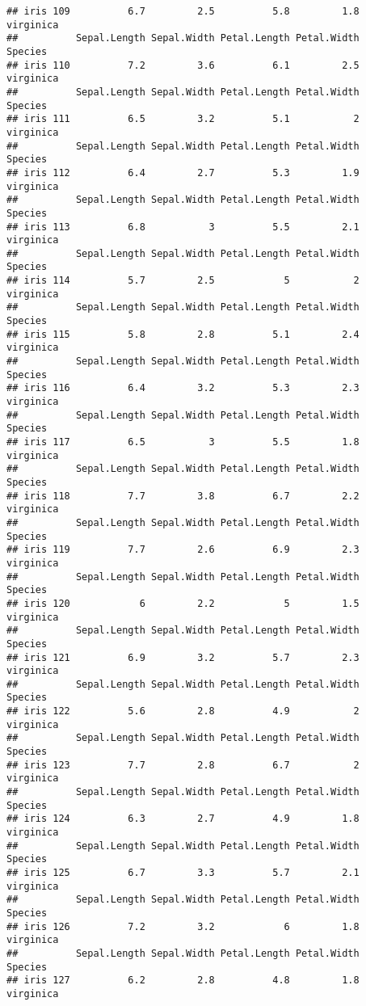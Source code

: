 \documentclass[
]{article}
\begin{document}
\begin{verbatim}
## iris 109          6.7         2.5          5.8         1.8 virginica
##          Sepal.Length Sepal.Width Petal.Length Petal.Width   Species
## iris 110          7.2         3.6          6.1         2.5 virginica
##          Sepal.Length Sepal.Width Petal.Length Petal.Width   Species
## iris 111          6.5         3.2          5.1           2 virginica
##          Sepal.Length Sepal.Width Petal.Length Petal.Width   Species
## iris 112          6.4         2.7          5.3         1.9 virginica
##          Sepal.Length Sepal.Width Petal.Length Petal.Width   Species
## iris 113          6.8           3          5.5         2.1 virginica
##          Sepal.Length Sepal.Width Petal.Length Petal.Width   Species
## iris 114          5.7         2.5            5           2 virginica
##          Sepal.Length Sepal.Width Petal.Length Petal.Width   Species
## iris 115          5.8         2.8          5.1         2.4 virginica
##          Sepal.Length Sepal.Width Petal.Length Petal.Width   Species
## iris 116          6.4         3.2          5.3         2.3 virginica
##          Sepal.Length Sepal.Width Petal.Length Petal.Width   Species
## iris 117          6.5           3          5.5         1.8 virginica
##          Sepal.Length Sepal.Width Petal.Length Petal.Width   Species
## iris 118          7.7         3.8          6.7         2.2 virginica
##          Sepal.Length Sepal.Width Petal.Length Petal.Width   Species
## iris 119          7.7         2.6          6.9         2.3 virginica
##          Sepal.Length Sepal.Width Petal.Length Petal.Width   Species
## iris 120            6         2.2            5         1.5 virginica
##          Sepal.Length Sepal.Width Petal.Length Petal.Width   Species
## iris 121          6.9         3.2          5.7         2.3 virginica
##          Sepal.Length Sepal.Width Petal.Length Petal.Width   Species
## iris 122          5.6         2.8          4.9           2 virginica
##          Sepal.Length Sepal.Width Petal.Length Petal.Width   Species
## iris 123          7.7         2.8          6.7           2 virginica
##          Sepal.Length Sepal.Width Petal.Length Petal.Width   Species
## iris 124          6.3         2.7          4.9         1.8 virginica
##          Sepal.Length Sepal.Width Petal.Length Petal.Width   Species
## iris 125          6.7         3.3          5.7         2.1 virginica
##          Sepal.Length Sepal.Width Petal.Length Petal.Width   Species
## iris 126          7.2         3.2            6         1.8 virginica
##          Sepal.Length Sepal.Width Petal.Length Petal.Width   Species
## iris 127          6.2         2.8          4.8         1.8 virginica

\end{verbatim}
\end{document}

